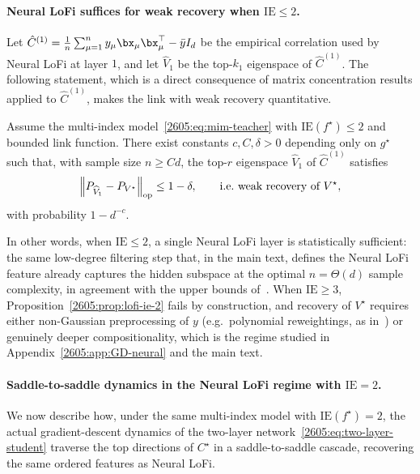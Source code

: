            \paragraph{Neural LoFi suffices for weak recovery when $\mathrm{IE}\le 2$.}
            Let $\hat C^{(1)}=\frac{1}{n}\sum_{\mu=1}^n y_\mu \bx_\mu\bx_\mu^\top - \bar y I_d$ be the empirical correlation used by Neural LoFi at layer $1$, and let $\widehat V_1$ be the top-$k_1$ eigenspace of $\hat C^{(1)}$. The following statement, which is a direct consequence of matrix concentration results applied to $\hat{C}^
            {(1)}$, makes the link with weak recovery quantitative.

            \begin{proposition}\label{2605:prop:lofi-ie-2}
            Assume the multi-index model~\eqref{2605:eq:mim-teacher} with $\mathrm{IE}(f^\star)\le 2$ and bounded link function. There exist constants $c,C,\delta>0$ depending only on $g^\star$ such that, with sample size $n\ge C d$, the top-$r$ eigenspace $\widehat V_1$ of $\hat C^{(1)}$ satisfies
            \begin{equation}
            \Bigl\| P_{\widehat V_1} - P_{V^\star} \Bigr\|_{\mathrm{op}}  \le  1-\delta,
            \qquad
            \text{i.e.\ weak recovery of }V^\star,
            \end{equation}
            with probability $1-d^{-c}$.
            \end{proposition}

            In other words, when $\mathrm{IE}\le 2$, a single Neural LoFi layer is statistically sufficient: the same low-degree filtering step that, in the main text, defines the Neural LoFi feature already captures the hidden subspace at the optimal $n=\Theta(d)$ sample complexity, in agreement with the upper bounds of~\cite{benarous2024stochastic,abbe2023sgd}. When $\mathrm{IE}\ge 3$, Proposition~\ref{2605:prop:lofi-ie-2} fails by construction, and recovery of $V^\star$ requires either non-Gaussian preprocessing of $y$ (e.g.\ polynomial reweightings, as in~\cite{damian2024computational,damian2026generative}) or genuinely deeper compositionality, which is the regime studied in Appendix~\ref{2605:app:GD-neural} and the main text.

            \paragraph{Saddle-to-saddle dynamics in the Neural LoFi regime with $\mathrm{IE}=2$.}
            We now describe how, under the same multi-index model with $\mathrm{IE}(f^\star)=2$, the actual gradient-descent dynamics of the two-layer network~\eqref{2605:eq:two-layer-student} traverse the top directions of $C^\star$ in a saddle-to-saddle cascade, recovering the same ordered features as Neural LoFi.

